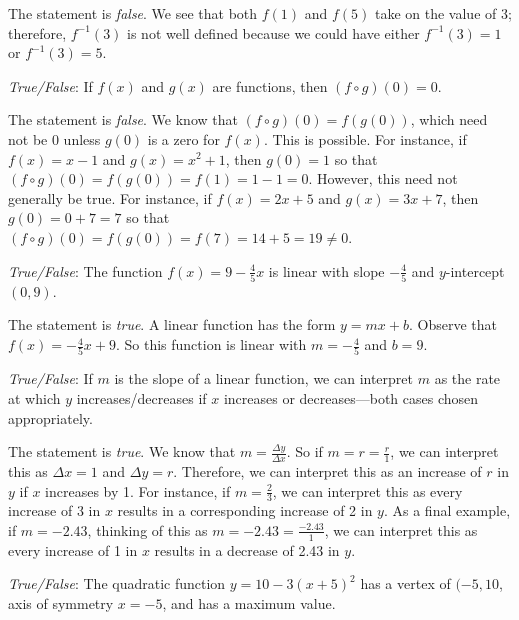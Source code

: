 \documentclass[11pt,letterpaper]{article}
\begin{document}
\sol The statement is \textit{false}. We see that both $f(1)$ and $f(5)$ take on the value of 3; therefore, $f^{-1}(3)$ is not well defined because we could have either $f^{-1}(3)= 1$ or $f^{-1}(3)= 5$. \pvspace{1.5cm}



\newpage



\quizsol \textit{True/False}: If $f(x)$ and $g(x)$ are functions, then $(f \circ g)(0)= 0$. \pspace

\sol The statement is \textit{false}. We know that $(f \circ g)(0)= f(g(0))$, which need not be 0 unless $g(0)$ is a zero for $f(x)$. This is possible. For instance, if $f(x)= x - 1$ and $g(x)= x^2 + 1$, then $g(0)= 1$ so that $(f \circ g)(0)= f(g(0))= f(1)= 1 - 1= 0$. However, this need not generally be true. For instance, if $f(x)= 2x + 5$ and $g(x)= 3x + 7$, then $g(0)= 0 + 7= 7$ so that $(f \circ g)(0)= f(g(0))= f(7)= 14 + 5= 19 \neq 0$. \pvspace{1.5cm} 



\quizsol \textit{True/False}: The function $f(x)= 9 - \frac{4}{5}x$ is linear with slope $-\frac{4}{5}$ and $y$-intercept $(0, 9)$. \pspace

\sol The statement is \textit{true}. A linear function has the form $y= mx + b$. Observe that $f(x)= -\frac{4}{5}x + 9$. So this function is linear with $m= -\frac{4}{5}$ and $b= 9$. \pvspace{1.5cm}



\quizsol \textit{True/False}: If $m$ is the slope of a linear function, we can interpret $m$ as the rate at which $y$ increases/decreases if $x$ increases or decreases---both cases chosen appropriately. \pspace

\sol The statement is \textit{true}. We know that $m= \frac{\Delta y}{\Delta x}$. So if $m= r= \frac{r}{1}$, we can interpret this as $\Delta x= 1$ and $\Delta y= r$. Therefore, we can interpret this as an increase of $r$ in $y$ if $x$ increases by 1. For instance, if $m= \frac{2}{3}$, we can interpret this as every increase of 3 in $x$ results in a corresponding increase of 2 in $y$. As a final example, if $m= -2.43$, thinking of this as $m= -2.43= \frac{-2.43}{1}$, we can interpret this as every increase of 1 in $x$ results in a decrease of 2.43 in $y$. \pvspace{1.5cm}



\quizsol \textit{True/False}: The quadratic function $y= 10 - 3(x + 5)^2$ has a vertex of $(-5, 10$, axis of symmetry $x= -5$, and has a maximum value. \pspace
\end{document}
